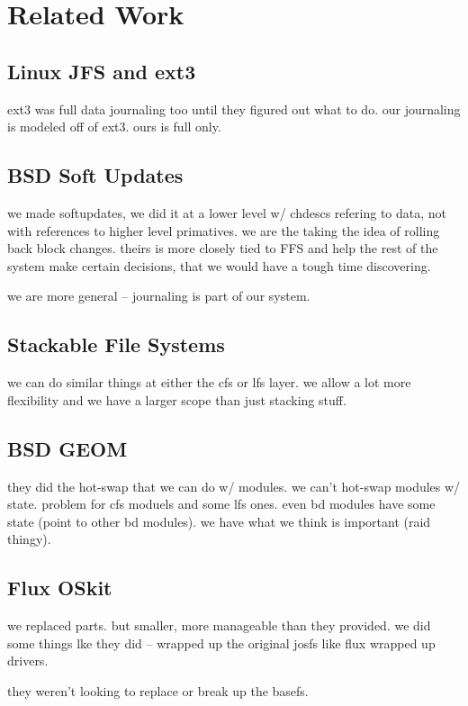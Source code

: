 \section{Related Work}
\label{sec:related}

\subsection{Linux JFS and ext3}

ext3 was full data journaling too until they figured out what to
do. our journaling is modeled off of ext3. ours is full only.

\subsection{BSD Soft Updates}

we made softupdates, we did it at a lower level w/ chdescs refering to
data, not with references to higher level primatives. we are the
taking the idea of rolling back block changes. theirs is more closely
tied to FFS and help the rest of the system make certain decisions,
that we would have a tough time discovering.

we are more general -- journaling is part of our system.

\subsection{Stackable File Systems}

we can do similar things at either the cfs or lfs layer. we allow a
lot more flexibility and we have a larger scope than just stacking
stuff.

\subsection{BSD GEOM}

they did the hot-swap that we can do w/ modules. we can't hot-swap
modules w/ state. problem for cfs moduels and some lfs ones. even bd
modules have some state (point to other bd modules). we have what we
think is important (raid thingy).

\subsection{Flux OSkit}

we replaced parts. but smaller, more manageable than they provided. we
did some things lke they did -- wrapped up the original josfs like
flux wrapped up drivers.

they weren't looking to replace or break up the basefs.
